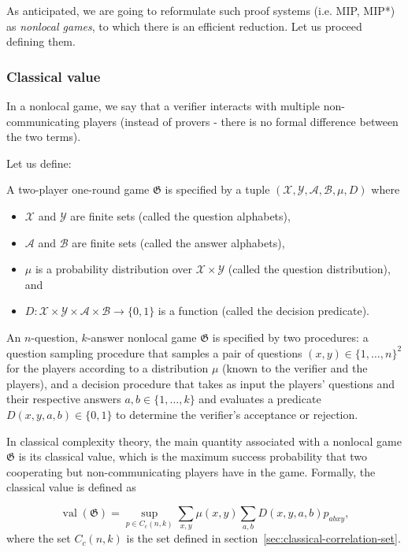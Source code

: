 As anticipated, we are going to reformulate such proof systems (i.e. MIP, MIP*) as \emph{nonlocal games}, to which there is an efficient reduction. Let us proceed defining them.
\subsubsection{Classical value}

In a nonlocal game, we say that a verifier interacts with multiple non-communicating players (instead of provers - there is no formal difference between the two terms). 

Let us define: 

\begin{defn} A two-player one-round game $\mathfrak{G}$ is specified by a tuple $(\mathcal{X}, \mathcal{Y}, \mathcal{A}, \mathcal{B}, \mu, D)$ where
    \begin{itemize}
        \item $\mathcal{X}$ and $\mathcal{Y}$ are finite sets (called the question alphabets),
        \item $\mathcal{A}$ and $\mathcal{B}$ are finite sets (called the answer alphabets),
        \item $\mu$ is a probability distribution over $\mathcal{X} \times \mathcal{Y}$ (called the question distribution), and
        \item $D: \mathcal{X} \times \mathcal{Y} \times \mathcal{A} \times \mathcal{B} \rightarrow\{0,1\}$ is a function (called the decision predicate).
    \end{itemize}
\end{defn}

An $n$-question, $k$-answer nonlocal game $\mathfrak{G}$ is specified by two procedures: a question sampling procedure that samples a pair of questions $(x, y) \in\{1, \ldots, n\}^{2}$ for the players according to a distribution $\mu$ (known to the verifier and the players), and a decision procedure that takes as input the players' questions and their respective answers $a, b \in\{1, \ldots, k\}$ and evaluates a predicate $D(x, y, a, b) \in\{0,1\}$ to determine the verifier's acceptance or rejection.

In classical complexity theory, the main quantity associated with a nonlocal game $\mathfrak{G}$ is its classical value, which is the maximum success probability that two cooperating but non-communicating players have in the game. Formally, the classical value is defined as

\begin{defn}\label{eq:classical-value}
\begin{equation}
\operatorname{val}(\mathfrak{G})=\sup _{p \in C_{c}(n, k)} \sum_{x, y} \mu(x, y) \sum_{a, b} D(x, y, a, b) p_{a b x y},
\end{equation}
where the set $C_{c}(n, k)$ is the set defined in section~\ref{sec:classical-correlation-set}.
\end{defn}

